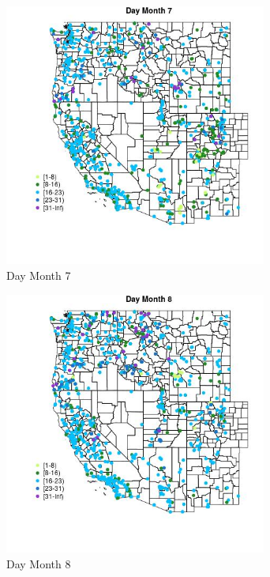 \begin{figure} 
\centering  
\includegraphics[width=0.77\textwidth]{Code_Outputs/Report_ML_input_PM25_Step4_part_e_de_duplicated_aveswNAs_MapObsMo7Day.jpg} 
\caption{\label{fig:Report_ML_input_PM25_Step4_part_e_de_duplicated_aveswNAsMapObsMo7Day}Day Month 7} 
\end{figure} 
 

\begin{figure} 
\centering  
\includegraphics[width=0.77\textwidth]{Code_Outputs/Report_ML_input_PM25_Step4_part_e_de_duplicated_aveswNAs_MapObsMo8Day.jpg} 
\caption{\label{fig:Report_ML_input_PM25_Step4_part_e_de_duplicated_aveswNAsMapObsMo8Day}Day Month 8} 
\end{figure} 
 

